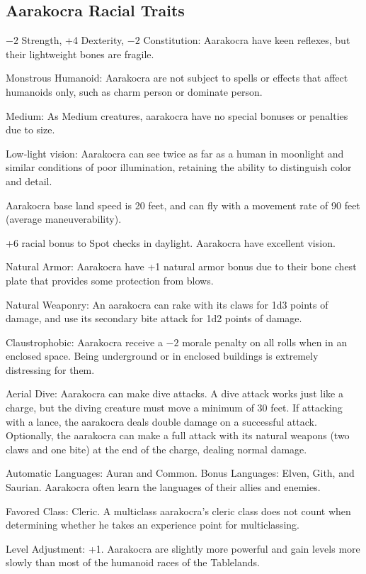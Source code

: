 \subsection{Aarakocra Racial Traits}
\begin{itemize*}
    \item $-2$ Strength, +4 Dexterity, $-2$ Constitution: Aarakocra have keen reflexes, but their lightweight bones are fragile.
    \item Monstrous Humanoid: Aarakocra are not subject to spells or effects that affect humanoids only, such as charm person or dominate person.
    \item Medium: As Medium creatures, aarakocra have no special bonuses or penalties due to size.
    \item Low‐light vision: Aarakocra can see twice as far as a human in moonlight and similar conditions of poor illumination, retaining the ability to distinguish color and detail.
    \item Aarakocra base land speed is 20 feet, and can fly with a movement rate of 90 feet (average maneuverability).
    \item +6 racial bonus to Spot checks in daylight. Aarakocra have excellent vision.
    \item Natural Armor: Aarakocra have +1 natural armor bonus due to their bone chest plate that provides some protection from blows.
    \item Natural Weaponry: An aarakocra can rake with its claws for 1d3 points of damage, and use its secondary bite attack for 1d2 points of damage.
    \item Claustrophobic: Aarakocra receive a $-2$ morale penalty on all rolls when in an enclosed space. Being underground or in enclosed buildings is extremely distressing for them.
    \item Aerial Dive: Aarakocra can make dive attacks. A dive attack works just like a charge, but the diving creature must move a minimum of 30 feet. If attacking with a lance, the aarakocra deals double damage on a successful attack. Optionally, the aarakocra can make a full attack with its natural weapons (two claws and one bite) at the end of the charge, dealing normal damage.
    \item Automatic Languages: Auran and Common. Bonus Languages: Elven, Gith, and Saurian. Aarakocra often learn the languages of their allies and enemies.
    \item Favored Class: Cleric. A multiclass aarakocra's cleric class does not count when determining whether he takes an experience point for multiclassing.
    \item Level Adjustment: +1. Aarakocra are slightly more powerful and gain levels more slowly than most of the humanoid races of the Tablelands.
\end{itemize*}